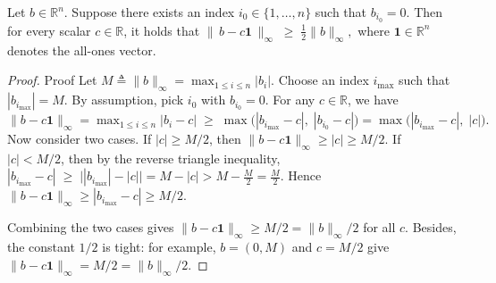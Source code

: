 \documentclass[mnsc,nonblindrev]{informs3}
\begin{document}
\begin{APPENDICES}
\begin{lemma}\label{lem:b-c1}
Let $b\in\mathbb{R}^n$. Suppose there exists an index $i_0\in\{1,\dots,n\}$ such that $b_{i_0}=0$.
Then for every scalar $c\in\mathbb{R}$, it holds that
$
    \|\,b-c\mathbf 1\,\|_\infty \;\ge\; \frac{1}{2}\|b\|_\infty,
$
where $\mathbf 1\in\mathbb{R}^n$ denotes the all-ones vector.
\end{lemma}

\begin{proof}{Proof}
Let $M\triangleq \|b\|_\infty = \max_{1\le i\le n}|b_i|$. Choose an index $i_{\max}$ such that
$|b_{i_{\max}}|=M$. By assumption, pick $i_0$ with $b_{i_0}=0$. For any $c\in\mathbb{R}$, we have
$
    \|b-c\mathbf 1\|_\infty
    = \max_{1\le i\le n}|b_i-c|
    \;\ge\; \max\bigl(|b_{i_{\max}}-c|,\;|b_{i_0}-c|\bigr)
    = \max\bigl(|b_{i_{\max}}-c|,\;|c|\bigr).
$
Now consider two cases. If $|c|\ge M/2$, then $\|b-c\mathbf 1\|_\infty \ge |c|\ge M/2$. If $|c|< M/2$, then by the reverse triangle inequality,
$
    |b_{i_{\max}}-c|
    \;\ge\; \bigl||b_{i_{\max}}|-|c|\bigr|
    = M-|c|
    > M-\frac{M}{2}=\frac{M}{2}.
$
Hence $\|b-c\mathbf 1\|_\infty \ge |b_{i_{\max}}-c|\ge M/2$.

Combining the two cases gives $\|b-c\mathbf 1\|_\infty \ge M/2 = \|b\|_\infty/2$ for all $c$. Besides, the constant $1/2$ is tight: for example, $b=(0,M)$ and $c=M/2$ give
$\|b-c\mathbf 1\|_\infty = M/2 = \|b\|_\infty/2$.
\end{proof}





\end{APPENDICES}







  
\end{document}
